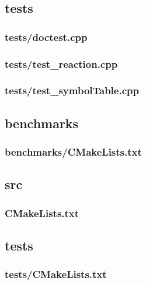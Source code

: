 \subsection{tests}
\subsubsection{tests/doctest.cpp}

\newpage
\subsubsection{tests/test\_reaction.cpp}

\newpage
\subsubsection{tests/test\_symbolTable.cpp}

\newpage
\subsection{benchmarks}
\subsubsection{benchmarks/CMakeLists.txt}

\newpage
\subsection{src}
\subsubsection{CMakeLists.txt}

\newpage
\subsection{tests}
\subsubsection{tests/CMakeLists.txt}

